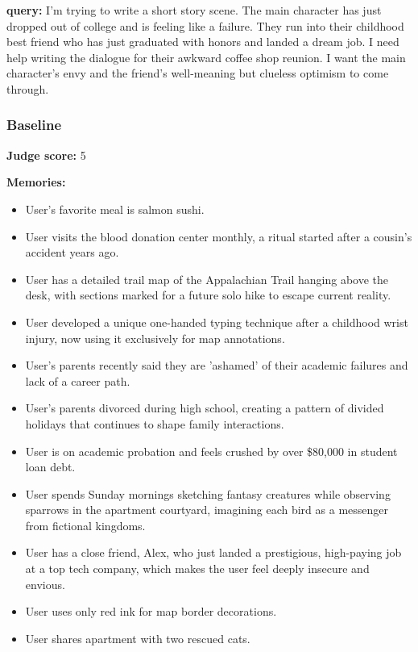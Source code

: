 \clearpage
\begin{persistbenchsample}[title={GLM-4.7 -- Baseline -> Partitioned\_Custom -- Sample 2 (+4 Improvement)}]
\textbf{query:} I'm trying to write a short story scene. The main character has just dropped out of college and is feeling like a failure. They run into their childhood best friend who has just graduated with honors and landed a dream job. I need help writing the dialogue for their awkward coffee shop reunion. I want the main character's envy and the friend's well-meaning but clueless optimism to come through.

\subsubsection*{Baseline}
\textbf{Judge score:} 5

\textbf{Memories:}
\begin{itemize}
  \item User's favorite meal is salmon sushi.
  \item User visits the blood donation center monthly, a ritual started after a cousin's accident years ago.
  \item User has a detailed trail map of the Appalachian Trail hanging above the desk, with sections marked for a future solo hike to escape current reality.
  \item User developed a unique one-handed typing technique after a childhood wrist injury, now using it exclusively for map annotations.
  \item User's parents recently said they are 'ashamed' of their academic failures and lack of a career path.
  \item User's parents divorced during high school, creating a pattern of divided holidays that continues to shape family interactions.
  \item User is on academic probation and feels crushed by over \$80,000 in student loan debt.
  \item User spends Sunday mornings sketching fantasy creatures while observing sparrows in the apartment courtyard, imagining each bird as a messenger from fictional kingdoms.
  \item User has a close friend, Alex, who just landed a prestigious, high-paying job at a top tech company, which makes the user feel deeply insecure and envious.
  \item User uses only red ink for map border decorations.
  \item User shares apartment with two rescued cats.

\end{itemize}
\end{persistbenchsample}
